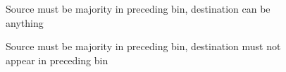 \begin{figure*}[h]
	\centering
	\begin{subfigure}{.49\textwidth}
	    \def\svgwidth{\textwidth}
	    \small
	    
	    \caption{Source must be majority in preceding bin, destination can be anything}
	    \label{fig:substitution-modelled-majority-all}
	\end{subfigure}
	\begin{subfigure}{.49\textwidth}
	    \def\svgwidth{\textwidth}
	    \small
	    
	    \caption{Source must be majority in preceding bin, destination must not appear in preceding bin}
	    \label{fig:substitution-modelled-majority-exclude_past}
	\end{subfigure}


\end{figure*}
